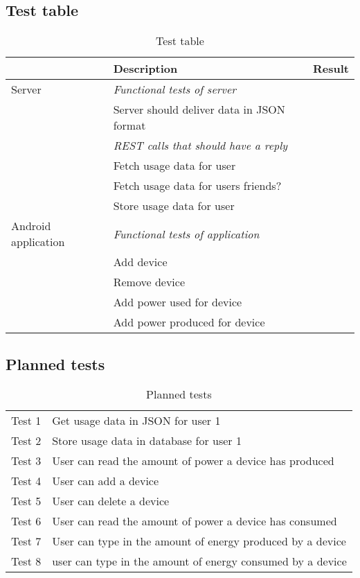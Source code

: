 \subsection{Test table}

\begin{table}[H]
\begin{tabular}{|l|l|l|}
\hline
\rowcolor{darkgray} & \textbf{Description} & \textbf{Result}\\\hline
\rowcolor{lightgray} Server& \textit{Functional tests of server}&\\
\rowcolor{lightgray}&Server should deliver data in JSON format&\\
\rowcolor{lightgray}&\textit{REST calls that should have a reply}&\\
\rowcolor{lightgray}&Fetch usage data for user&\\
\rowcolor{lightgray}&Fetch usage data for users friends?&\\
\rowcolor{lightgray}&Store usage data for user&\\\hline
\rowcolor{darkgray}Android application & \textit{Functional tests of application} &  \\
\rowcolor{darkgray}&Add device&\\
\rowcolor{darkgray}&Remove device&\\
\rowcolor{darkgray}&Add power used for device&\\
\rowcolor{darkgray}&Add power produced for device&\\
\hline
\end{tabular}
\caption{Test table}
\label{tab:testTable}
\end{table}

\subsection{Planned tests}
\begin{table}[H]
\centering
{}
\begin{tabular}{|l|l|}
\hline
Test 1&Get usage data in JSON for user 1\\
Test 2&Store usage data in database for user 1\\
Test 3&User can read the amount of power a device has produced\\
Test 4&User can add a device\\
Test 5&User can delete a device\\
Test 6&User can read the amount of power a device has consumed\\
Test 7&User can type in the amount of energy produced by a device\\
Test 8&user can type in the amount of energy consumed by a device\\
\hline
\end{tabular}
\caption{Planned tests}
\label{tab:plannedTable}
\end{table}

